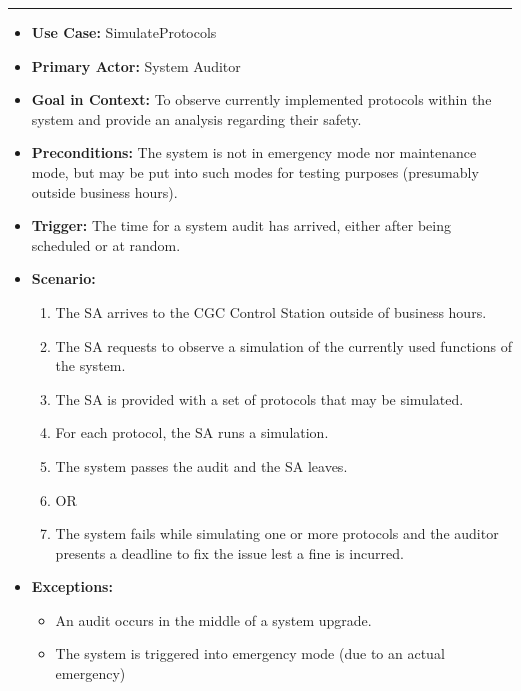 \documentclass[12pt]{article}
\begin{document}
    \par\noindent\rule{\textwidth}{0.4pt}
    \begin{itemize}
        \item[]\textbf{Use Case:}                                
            SimulateProtocols

        \item[]\textbf{Primary Actor:}
            System Auditor

        \item[]\textbf{Goal in Context:}
            To observe currently implemented protocols within the system and provide an analysis
            regarding their safety.

        \item[]\textbf{Preconditions:}
            The system is not in emergency mode nor maintenance mode, but may be put into such
            modes for testing purposes (presumably outside business hours).

        \item[]\textbf{Trigger:}
            The time for a system audit has arrived, either after being scheduled or at random.

        \item[]\textbf{Scenario:}
            \begin{enumerate}
                \item The SA arrives to the CGC Control Station outside of business hours.
                \item The SA requests to observe a simulation of the currently used functions of the system.
                \item The SA is provided with a set of protocols that may be simulated.
                \item For each protocol, the SA runs a simulation.
                \item The system passes the audit and the SA leaves.
                \item OR
                \item The system fails while simulating one or more protocols and the auditor presents a deadline
                to fix the issue lest a fine is incurred.
            \end{enumerate}

        \item[]\textbf{Exceptions:}
            \begin{itemize}
                \item[] An audit occurs in the middle of a system upgrade.
                \item[] The system is triggered into emergency mode (due to an actual emergency)
            \end{itemize}


\end{itemize}
\end{document}
